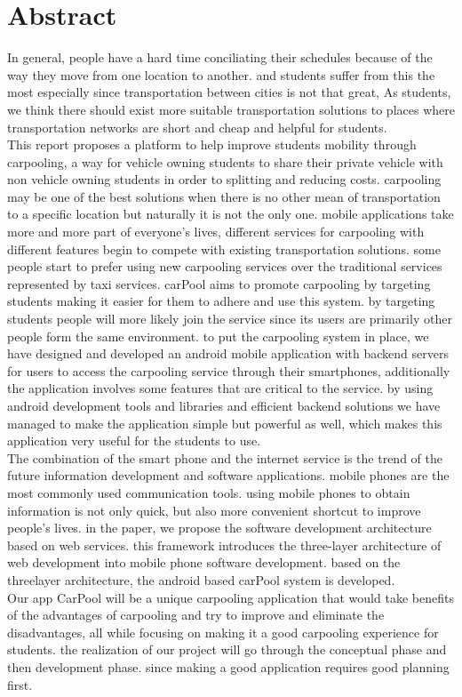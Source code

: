 \chapter*{Abstract}
In general, people have a hard time conciliating their schedules because of the way they move from one location to another.  and students suffer from this the most  especially  since transportation between cities is not that great,  As students, we think there should exist more suitable transportation solutions to places where transportation networks are short and cheap and helpful for students.
\\ This  report  proposes  a  platform  to  help  improve students  mobility  through carpooling, a way for vehicle owning students to share their private vehicle with non vehicle owning students in order to splitting and reducing costs. carpooling may be one of the best solutions when there is no other  mean  of  transportation  to a  specific location  but naturally  it  is not  the  only one. mobile applications  take more  and more  part of  everyone’s  lives, different  services for carpooling with different features begin to compete with existing transportation solutions. some people start to  prefer using  new carpooling  services  over the  traditional services represented  by  taxi  services. carPool  aims  to  promote  carpooling  by  targeting  students making it easier for them to adhere and use this system.  by  targeting  students  people  will  more  likely  join  the  service  since  its  users  are primarily other people form the same environment. to put the carpooling system in place, we have designed and developed an android mobile application with backend servers for users  to  access  the  carpooling  service  through  their  smartphones,  additionally  the application  involves  some  features  that  are  critical  to  the  service.  by  using  android development  tools  and  libraries and  efficient backend  solutions  we  have managed  to make the application simple but powerful as well, which makes this application very useful for the students to use.
\\ The combination of the smart phone and the internet service is the trend of the future information development and software applications. mobile phones are the most commonly used communication tools. using mobile phones to obtain information is not only quick, but also more convenient shortcut to improve people's lives. in the paper, we propose the software development architecture based on web services. this framework introduces the three-layer architecture of web development into mobile phone software development. based on the threelayer architecture, the android based carPool system is developed.
\\ Our app CarPool will be a unique carpooling application that would take benefits of the advantages of carpooling and try to improve and eliminate the disadvantages, all while focusing on making it a good carpooling experience for students. the realization of our project will go through the conceptual phase and then development phase. since making a good application requires good planning first.